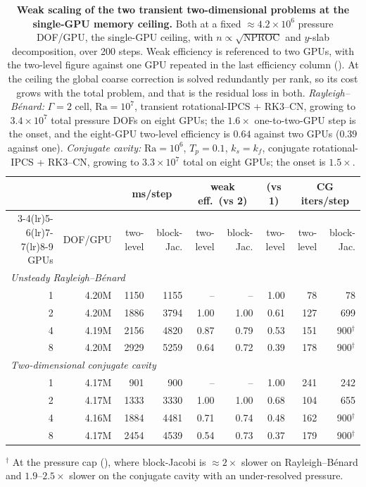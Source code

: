 \begin{table}[ht]\centering
\caption{\textbf{Weak scaling of the two transient two-dimensional problems at the single-GPU
memory ceiling.} Both at a fixed $\approx\!4.2\times10^{6}$ pressure DOF/GPU, the single-GPU
ceiling, with $n\propto\sqrt{\text{NPROC}}$ and $y$-slab decomposition, over 200 steps. Weak
efficiency is referenced to two GPUs, with the two-level figure against one GPU repeated in
the last efficiency column (). At the ceiling the global coarse
correction is solved redundantly per rank, so its cost grows with the total problem, and that
is the residual loss in both.
\emph{Rayleigh--B\'enard:} $\Gamma=2$ cell, $\mathrm{Ra}=10^{7}$, transient rotational-IPCS + RK3--CN,
growing to $3.4\times10^{7}$ total pressure DOFs on eight GPUs; the $1.6\times$ one-to-two-GPU
step is the onset, and the eight-GPU two-level efficiency is $0.64$ against two GPUs ($0.39$
against one).
\emph{Conjugate cavity:} $\mathrm{Ra}=10^{6}$, $T_p=0.1$, $k_s=k_f$, conjugate rotational-IPCS +
RK3--CN, growing to $3.3\times10^{7}$ total on eight GPUs; the onset is $1.5\times$.}
\label{tab:weak-transient}
\footnotesize\setlength{\tabcolsep}{4pt}
\begin{tabular}{r r r r r r r r r}
\toprule
 & & \multicolumn{2}{c}{ms/step} & \multicolumn{2}{c}{weak eff.\ (vs 2)} & \multicolumn{1}{c}{(vs 1)} & \multicolumn{2}{c}{CG iters/step} \\
\cmidrule(lr){3-4}\cmidrule(lr){5-6}\cmidrule(lr){7-7}\cmidrule(lr){8-9}
{GPUs} & {DOF/GPU} & {two-level} & {block-Jac.} & {two-level} & {block-Jac.} & {two-level} & {two-level} & {block-Jac.} \\
\midrule
\multicolumn{9}{l}{\emph{Unsteady Rayleigh--B\'enard}}\\
\midrule
1 & 4.20M & 1150 & 1155 & {--}  & {--}  & 1.00 & 78  & 78            \\
2 & 4.20M & 1886 & 3794 & 1.00  & 1.00  & 0.61 & 127 & 699           \\
4 & 4.19M & 2156 & 4820 & 0.87  & 0.79  & 0.53 & 151 & 900$^\dagger$ \\
8 & 4.20M & 2929 & 5259 & 0.64  & 0.72  & 0.39 & 178 & 900$^\dagger$ \\
\midrule
\multicolumn{9}{l}{\emph{Two-dimensional conjugate cavity}}\\
\midrule
1 & 4.17M & 901  & 900  & {--}  & {--}  & 1.00 & 241 & 242           \\
2 & 4.17M & 1333 & 3330 & 1.00  & 1.00  & 0.68 & 104 & 655           \\
4 & 4.16M & 1884 & 4481 & 0.71  & 0.74  & 0.48 & 162 & 900$^\dagger$ \\
8 & 4.17M & 2454 & 4539 & 0.54  & 0.73  & 0.37 & 179 & 900$^\dagger$ \\
\bottomrule
\end{tabular}

\smallskip
{\footnotesize $^\dagger$ At the pressure cap (), where
block-Jacobi is $\approx\!2\times$ slower on Rayleigh--B\'enard and $1.9$--$2.5\times$ slower on
the conjugate cavity with an under-resolved pressure.}
\end{table}

